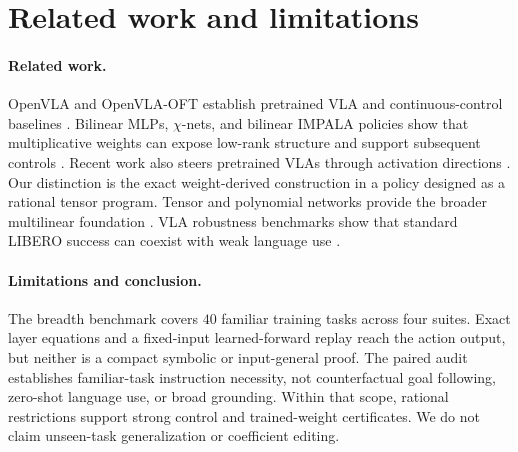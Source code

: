 \documentclass{article}
\begin{document}
\section{Related work and limitations}

\paragraph{Related work.}
OpenVLA and OpenVLA-OFT establish pretrained VLA and continuous-control baselines
\cite{openvla,openvlaoft}. Bilinear MLPs, $\chi$-nets, and bilinear IMPALA policies show that
multiplicative weights can expose low-rank structure and support subsequent controls
\cite{pearce,chinets,bimpala}. Recent work also steers pretrained VLAs through activation
directions \cite{haonsteering}. Our distinction is the exact weight-derived construction in a
policy designed as a rational tensor program. Tensor and polynomial networks provide the broader
multilinear foundation \cite{koldabader,stoudenmire,chrysos}. VLA robustness benchmarks show
that standard LIBERO success can coexist with weak language use
\cite{liberopro,liberocf,liberopara}.

\paragraph{Limitations and conclusion.}
The breadth benchmark covers $40$ familiar training tasks across four suites. Exact layer equations and a fixed-input learned-forward
replay reach the action output, but neither is a compact symbolic or input-general proof. The paired
audit establishes familiar-task instruction necessity, not counterfactual goal following, zero-shot
language use, or broad grounding. Within that scope, rational restrictions support strong control
and trained-weight certificates. We do not claim unseen-task generalization or coefficient editing.
\end{document}
